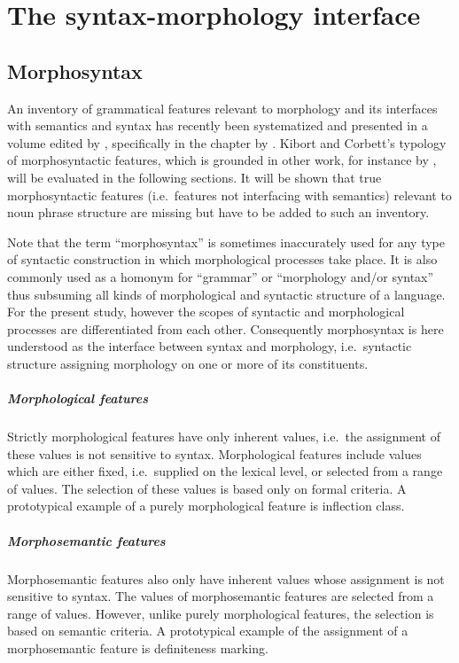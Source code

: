 
\chapter{The syntax-morphology interface} \label{syntax-morphology-interface}

\section{Morphosyntax}
An inventory of grammatical features relevant to morphology and its interfaces with semantics and syntax has recently been systematized and presented in a volume edited by \citet{kibort-etal2010}, specifically in the chapter by \citet{kibort2010a}. Kibort and Corbett's typology of morphosyntactic features, which is grounded in other work, for instance by \citet{aronoff1994,corbett1987,carstairs-mccarthy1999,corbett2006,corbett-etal2006,bickel-etal2007,kibort2008a}, will be evaluated in the following sections. It will be shown that true morphosyntactic features (i.e.~features not interfacing with semantics) relevant to noun phrase structure are missing but have to be added to such an inventory.

Note that the term “morphosyntax” is sometimes inaccurately used for any type of syntactic construction in which morphological processes take place. It is also commonly used as a homonym for “grammar” or “morphology and/or syntax” thus subsuming all kinds of morphological and syntactic structure of a language. For the present study, however the scopes of syntactic and morphological processes are differentiated from each other. Consequently morphosyntax is here understood as the interface between syntax and morphology, i.e.~syntactic structure assigning morphology on one or more of its constituents.
\paragraph{Morphological features} 
Strictly morphological features have only inherent values, i.e.~the assignment of these values is not sensitive to syntax. Morphological features include values which are either fixed, i.e.~supplied on the lexical level, or selected from a range of values. The selection of these values is based only on formal criteria. A prototypical example of a purely morphological feature is inflection class.
\paragraph{Morphosemantic features} 
Morphosemantic features also only have inherent values whose assignment is not sensitive to syntax. The values of morphosemantic features are selected from a range of values. However, unlike purely morphological features, the selection is based on semantic criteria. A prototypical example of the assignment of a morphosemantic feature is definiteness marking.
